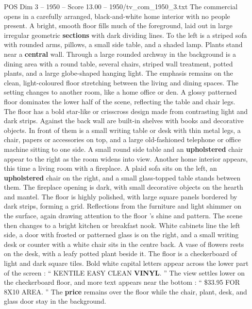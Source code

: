 \begin{textsample}{POS Dim 3 – 1950 – Score 13.00 – 1950/tv\_com\_1950\_3.txt}  \label{ex:f3_pos_011}
The commercial opens in a carefully arranged, black-and-white home interior with no people present.
A bright, smooth floor fills much of the foreground, laid out in large irregular geometric \textbf{sections} with dark dividing lines.
To the left is a striped sofa with rounded arms, pillows, a small side table, and a shaded lamp.
Plants stand near a \textbf{central} wall.
Through a large rounded archway in the background is a dining area with a round table, several chairs, striped wall treatment, potted plants, and a large globe-shaped hanging light.
The emphasis remains on the clean, light-coloured floor stretching between the living and dining spaces.
The setting changes to another room, like a home office or den.
A glossy patterned floor dominates the lower half of the scene, reflecting the table and chair legs.
The floor has a bold star-like or crisscross design made from contrasting light and dark strips.
Against the back wall are built-in shelves with books and decorative objects.
In front of them is a small writing table or desk with thin metal legs, a chair, papers or accessories on top, and a large old-fashioned telephone or office machine sitting to one side.
A small round side table and an \textbf{upholstered} chair appear to the right as the room widens into view.
Another home interior appears, this time a living room with a fireplace.
A plaid sofa sits on the left, an \textbf{upholstered} chair on the right, and a small glass-topped table stands between them.
The fireplace opening is dark, with small decorative objects on the hearth and mantel.
The floor is highly polished, with large square panels bordered by dark strips, forming a grid.
Reflections from the furniture and light shimmer on the surface, again drawing attention to the floor ’s shine and pattern.
The scene then changes to a bright kitchen or breakfast nook.
White cabinets line the left side, a door with frosted or patterned glass is on the right, and a small writing desk or counter with a white chair sits in the centre back.
A vase of flowers rests on the desk, with a leafy potted plant beside it.
The floor is a checkerboard of light and dark square tiles.
Bold white capital letters appear across the lower part of the screen : “ KENTILE EASY CLEAN \textbf{VINYL}. ” The view settles lower on the checkerboard floor, and more text appears near the bottom : “ \$33.95 FOR 8X10 AREA. ” The \textbf{price} remains over the floor while the chair, plant, desk, and glass door stay in the background.

\end{textsample}
